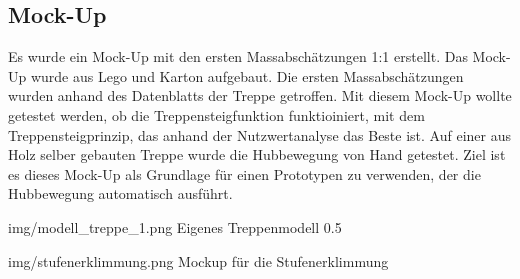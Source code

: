 \subsection{Mock-Up}
 
 Es wurde ein Mock-Up mit den ersten Massabschätzungen 1:1 erstellt. Das Mock-Up wurde aus Lego und Karton aufgebaut. Die ersten Massabschätzungen wurden anhand des Datenblatts der Treppe getroffen. Mit diesem Mock-Up wollte getestet werden, ob die Treppensteigfunktion funktioiniert, mit dem Treppensteigprinzip, das anhand der Nutzwertanalyse das Beste ist. Auf einer aus Holz selber gebauten Treppe wurde die Hubbewegung von Hand getestet.
 Ziel ist es dieses Mock-Up als Grundlage für einen Prototypen zu verwenden, der die Hubbewegung automatisch ausführt.
 
 \imagewidth
   {img/modell_treppe_1.png}
   {Eigenes Treppenmodell}
   {0.5\textwidth}

 \image
   {img/stufenerklimmung.png}
   {Mockup für die Stufenerklimmung}
   
\newpage